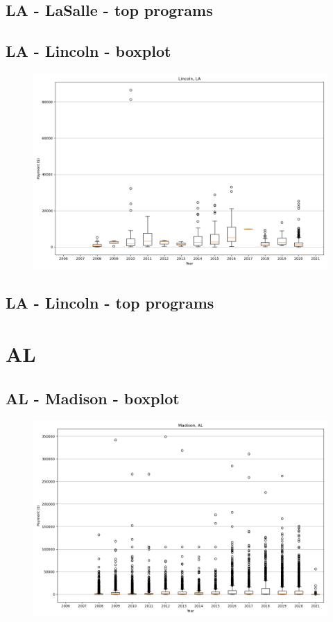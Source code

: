 \subsection*{LA - LaSalle - top programs}

\newpage
\subsection*{LA - Lincoln - boxplot}
\begin{figure}[h]
\centering
\includegraphics[width=7in]{../output/boxplots/counties/Lincoln-LA_boxplot.png}
\end{figure}


\subsection*{LA - Lincoln - top programs}

\newpage
\section*{AL}
\subsection*{AL - Madison - boxplot}
\begin{figure}[h]
\centering
\includegraphics[width=7in]{../output/boxplots/counties/Madison-AL_boxplot.png}
\end{figure}



